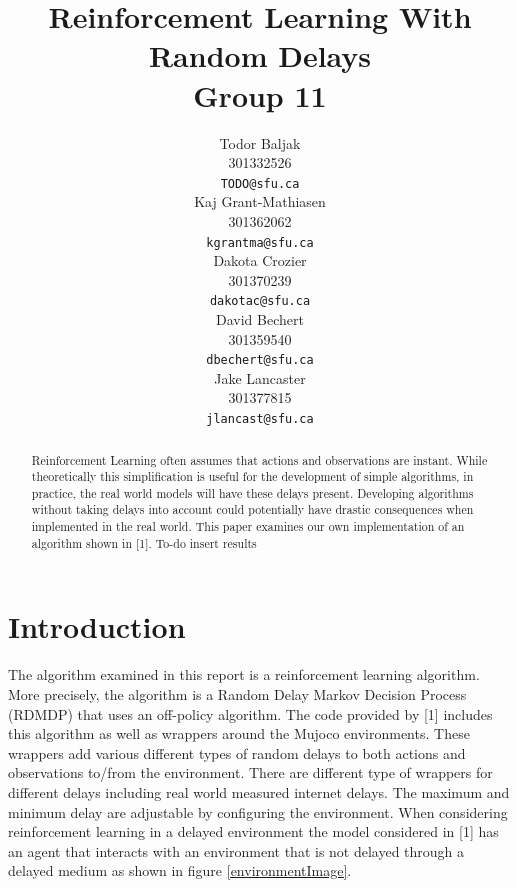 \documentclass{article} %
\title{Reinforcement Learning With Random Delays\\Group 11}
\author{
   Todor Baljak\\
   301332526\\
   \texttt{TODO@sfu.ca}\\
\And
   Kaj Grant-Mathiasen\\
   301362062\\
   \texttt{kgrantma@sfu.ca}\\
\And
   Dakota Crozier\\
   301370239\\
   \texttt{dakotac@sfu.ca}\\
\AND
   David Bechert\\
   301359540\\
   \texttt{dbechert@sfu.ca}\\
\And
   Jake Lancaster\\
   301377815\\
   \texttt{jlancast@sfu.ca} \\
}
\begin{document}
\maketitle

\begin{abstract}
   Reinforcement Learning often assumes that actions and observations are instant. 
   While theoretically this simplification is useful for the development of simple 
   algorithms, in practice, the real world models will have these delays present. 
   Developing algorithms without taking delays into account could potentially have 
   drastic consequences when implemented in the real world. This paper examines
   our own implementation of an algorithm shown in [1]. To-do insert results 
\end{abstract}

\section{Introduction} \label{Introduction}

The algorithm examined in this report is a reinforcement learning algorithm.
More precisely, the algorithm is a Random Delay Markov Decision Process (RDMDP) that uses an 
off-policy algorithm. 
The code provided by [1] includes this algorithm as well as  wrappers around the Mujoco environments.
These wrappers add various different types of random delays to both actions and observations to/from 
the environment. 
There are different type of wrappers for different delays including real world measured 
internet delays. 
The maximum and minimum delay are adjustable by configuring the environment. 
When considering reinforcement learning in a delayed environment the model considered in [1]
has an agent that interacts with an environment that is not delayed through a delayed medium as shown in figure \ref{environmentImage}.
\end{document}
